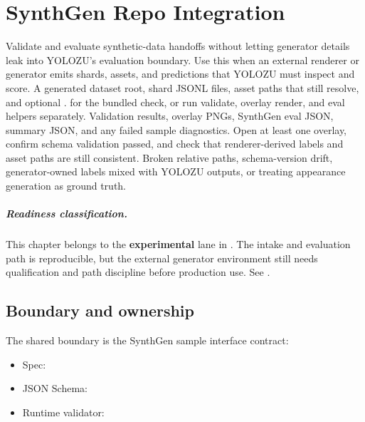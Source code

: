 \chapter{SynthGen Repo Integration}

\WorkflowOpening
{Validate and evaluate synthetic-data handoffs without letting generator details leak into YOLOZU's evaluation boundary.}
{Use this when an external renderer or generator emits shards, assets, and predictions that YOLOZU must inspect and score.}
{A generated dataset root, shard JSONL files, asset paths that still resolve, and optional .}
{ for the bundled check, or run validate, overlay render, and eval helpers separately.}
{Validation results, overlay PNGs, SynthGen eval JSON, summary JSON, and any failed sample diagnostics.}
{Open at least one overlay, confirm schema validation passed, and check that renderer-derived labels and asset paths are still consistent.}
{Broken relative paths, schema-version drift, generator-owned labels mixed with YOLOZU outputs, or treating appearance generation as ground truth.}

\paragraph{Readiness classification.}
This chapter belongs to the \textbf{experimental} lane in \yolozu{}.
The intake and evaluation path is reproducible, but the external generator environment still needs qualification and path discipline before production use.
See .

\section{Boundary and ownership}

The shared boundary is the SynthGen sample interface contract:
\begin{itemize}
  \item Spec: 
  \item JSON Schema: 
  \item Runtime validator: 
\end{itemize}

